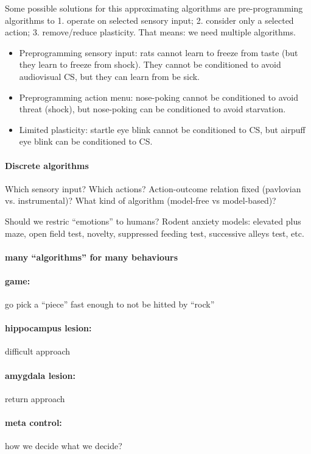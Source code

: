 \documentclass[12pt,article,oneside,a4paper]{memoir}
\begin{document}
Some possible solutions for this approximating algorithms are pre-programming
algorithms to 1. operate on selected sensory input; 2. consider only a selected 
action; 3. remove/reduce plasticity. That means: we need multiple algorithms.

\begin{itemize}
\item Preprogramming sensory input: rats cannot learn to freeze from taste
(but they learn to freeze from shock). They cannot be conditioned to avoid
audiovisual CS, but they can learn from be sick.
\item Preprogramming action menu: nose-poking cannot be conditioned to avoid
threat (shock), but nose-poking can be conditioned to avoid starvation.
\item Limited plasticity: startle eye blink cannot be conditioned to CS, but
airpuff eye blink can be conditioned to CS.
\end{itemize}

\paragraph{Discrete algorithms}
Which sensory input? Which actions? Action-outcome relation fixed
(pavlovian vs. instrumental)? What kind of algorithm (model-free vs model-based)?

Should we restric ``emotions'' to humans?
Rodent anxiety models: elevated plus maze, open field test, novelty, suppressed
feeding test, successive alleys test, etc.

\paragraph{many ``algorithms'' for many behaviours}
\paragraph{game:} go pick a ``piece'' fast enough to not be hitted by ``rock''
\paragraph{hippocampus lesion:} difficult approach
\paragraph{amygdala lesion:} return approach

\paragraph{meta control:} how we decide what we decide?
\end{document}
